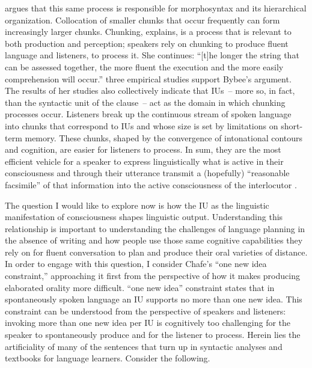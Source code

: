 \noindent \citet{Bybee2010} argues that this same process is responsible for morphosyntax and its hierarchical organization. Collocation of smaller chunks that occur frequently can form increasingly larger chunks. Chunking, \citet[34]{Bybee2010} explains, is a process that is relevant to both production and perception; speakers rely on chunking to produce fluent language and listeners, to process it. She continues: “[t]he longer the string that can be assessed together, the more fluent the execution and the more easily comprehension will occur.”  three empirical studies support Bybee’s argument. The results of her studies also collectively indicate that IUs~-- more so, in fact, than the syntactic unit of the clause~-- act as the domain in which chunking processes occur. Listeners break up the continuous stream of spoken language into chunks that correspond to IUs and whose size is set by limitations on short-term memory. These chunks, shaped by the convergence of intonational contours and cognition, are easier for listeners to process. In sum, they are the most efficient vehicle for a speaker to express linguistically what is active in their consciousness and through their utterance transmit a (hopefully) “reasonable facsimile” of that information into the active consciousness of the interlocutor \citep[63]{Chafe1994}.

The question I would like to explore now is how the IU as the linguistic manifestation of consciousness shapes linguistic output. Understanding this relationship is important to understanding the challenges of language planning in the absence of writing and how people use those same cognitive capabilities they rely on for fluent conversation to plan and produce their oral varieties of distance. In order to engage with this question, I consider Chafe’s “one new idea constraint,” approaching it first from the perspective of how it makes producing elaborated orality more difficult.  “one new idea” constraint states that in spontaneously spoken language an IU supports no more than one new idea. This constraint can be understood from the perspective of speakers and listeners: invoking more than one new idea per IU is cognitively too challenging for the speaker to spontaneously produce and for the listener to process. Herein lies the artificiality of many of the sentences that turn up in syntactic analyses and textbooks for language learners. Consider the following.

\ea%
    \label{ex:6:2}

